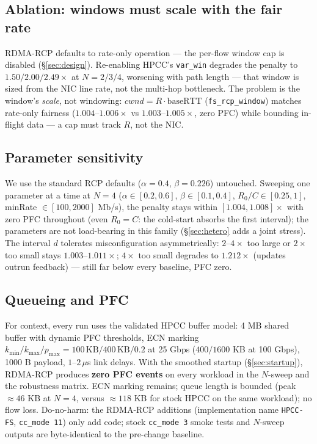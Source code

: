 \documentclass[sigconf, nonacm]{acmart}
\newcommand{\hpccfs}{\textsc{RDMA-RCP}\xspace}
\begin{document}
\subsection{Ablation: windows must scale with the fair rate}
\label{sec:ablation}

\hpccfs defaults to rate-only operation --- the per-flow window cap is disabled
(\S\ref{sec:design}). Re-enabling HPCC's \texttt{var\_win} degrades the penalty to
$1.50/2.00/2.49\times$ at $N = 2/3/4$, worsening with path length --- that window is sized
from the NIC line rate, not the multi-hop bottleneck. The problem is the window's
\emph{scale}, not windowing: $\mathit{cwnd} = R \cdot \mathrm{baseRTT}$
(\texttt{fs\_rcp\_window}) matches rate-only fairness ($1.004$--$1.006\times$ vs
$1.003$--$1.005\times$, zero PFC) while bounding in-flight data --- a cap must track $R$,
not the NIC.

\subsection{Parameter sensitivity}
\label{sec:sensitivity}

We use the standard RCP defaults ($\alpha = 0.4$, $\beta = 0.226$) untouched. Sweeping
one parameter at a time at $N = 4$ ($\alpha \in [0.2, 0.6]$, $\beta \in [0.1, 0.4]$,
$R_0/C \in [0.25, 1]$, minRate $\in [100, 2000]$ Mb/s), the penalty stays within
$[1.004, 1.008]\times$ with zero PFC throughout (even $R_0 = C$: the cold-start absorbs the
first interval); the parameters are not load-bearing in this family (\S\ref{sec:hetero} adds
a joint stress). The interval $d$ tolerates misconfiguration asymmetrically: $2$--$4\times$
too large or $2\times$ too small stays $1.003$--$1.011\times$; $4\times$ too small degrades
to $1.212\times$ (updates outrun feedback) --- still far below every baseline, PFC zero.

\subsection{Queueing and PFC}
\label{sec:queue}

For context, every run uses the validated HPCC buffer model: 4 MB shared buffer with dynamic
PFC thresholds, ECN marking $k_{\min}/k_{\max}/p_{\max} = 100\,\mathrm{KB}/400\,\mathrm{KB}/0.2$
at 25 Gbps ($400/1600$ KB at 100 Gbps), 1000 B payload, $1$--$2\,\mu$s link delays. With the
smoothed startup (\S\ref{sec:startup}), \hpccfs produces \textbf{zero PFC events} on
every workload in the $N$-sweep and the robustness matrix. ECN marking remains; queue length is
bounded (peak ${\approx}46$ KB at $N=4$, versus ${\approx}118$ KB for stock HPCC on the same
workload); no flow loss. Do-no-harm: the \hpccfs additions (implementation name
\texttt{HPCC-FS}, \texttt{cc\_mode 11}) only add code; stock \texttt{cc\_mode 3} smoke
tests and $N$-sweep outputs are byte-identical to the pre-change baseline.
\end{document}

